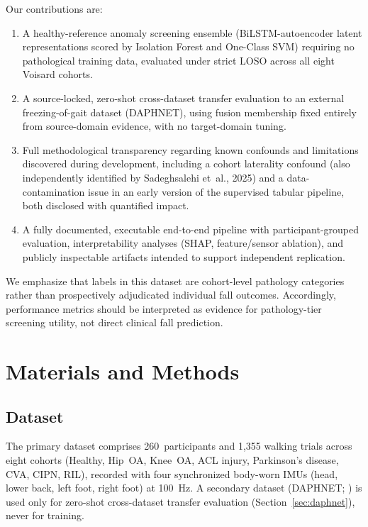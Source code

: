 \documentclass[11pt,a4paper]{article}
\begin{document}
Our contributions are:
\begin{enumerate}[leftmargin=*]
  \item A healthy-reference anomaly screening ensemble (BiLSTM-autoencoder latent representations scored by Isolation Forest and One-Class SVM) requiring no pathological training data, evaluated under strict LOSO across all eight Voisard cohorts.
  \item A source-locked, zero-shot cross-dataset transfer evaluation to an external freezing-of-gait dataset (DAPHNET), using fusion membership fixed entirely from source-domain evidence, with no target-domain tuning.
  \item Full methodological transparency regarding known confounds and limitations discovered during development, including a cohort laterality confound (also independently identified by Sadeghsalehi et~al., 2025) and a data-contamination issue in an early version of the supervised tabular pipeline, both disclosed with quantified impact.
  \item A fully documented, executable end-to-end pipeline with participant-grouped evaluation, interpretability analyses (SHAP, feature/sensor ablation), and publicly inspectable artifacts intended to support independent replication.
\end{enumerate}

We emphasize that labels in this dataset are cohort-level pathology categories rather than prospectively adjudicated individual fall outcomes. Accordingly, performance metrics should be interpreted as evidence for pathology-tier screening utility, not direct clinical fall prediction.

\section{Materials and Methods}

\subsection{Dataset}

The primary dataset \citep{voisard2025,voisard2025figshare} comprises 260~participants and 1{,}355 walking trials across eight cohorts (Healthy, Hip~OA, Knee~OA, ACL injury, Parkinson's disease, CVA, CIPN, RIL), recorded with four synchronized body-worn IMUs (head, lower back, left foot, right foot) at 100~Hz. A secondary dataset (DAPHNET; \cite{bachlin2010daphnet}) is used only for zero-shot cross-dataset transfer evaluation (Section~\ref{sec:daphnet}), never for training.
\end{document}
